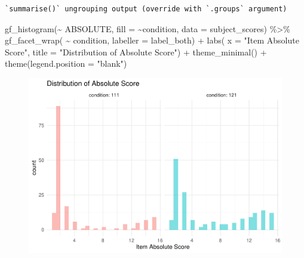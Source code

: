 \documentclass[
  letterpaper,
  DIV=11,
  numbers=noendperiod]{scrreprt}
\newenvironment{Shaded}{\begin{snugshade}}{\end{snugshade}}
\newcommand{\AttributeTok}[1]{\textcolor[rgb]{0.40,0.45,0.13}{#1}}
\newcommand{\FunctionTok}[1]{\textcolor[rgb]{0.28,0.35,0.67}{#1}}
\newcommand{\NormalTok}[1]{\textcolor[rgb]{0.00,0.23,0.31}{#1}}
\newcommand{\SpecialCharTok}[1]{\textcolor[rgb]{0.37,0.37,0.37}{#1}}
\newcommand{\StringTok}[1]{\textcolor[rgb]{0.13,0.47,0.30}{#1}}
\begin{document}
\begin{verbatim}
`summarise()` ungrouping output (override with `.groups` argument)
\end{verbatim}

\begin{Shaded}
\begin{Highlighting}[]
\FunctionTok{gf\_histogram}\NormalTok{(}\SpecialCharTok{\textasciitilde{}}\NormalTok{ ABSOLUTE, }\AttributeTok{fill =} \SpecialCharTok{\textasciitilde{}}\NormalTok{condition, }\AttributeTok{data =}\NormalTok{ subject\_scores) }\SpecialCharTok{\%\textgreater{}\%} 
  \FunctionTok{gf\_facet\_wrap}\NormalTok{( }\SpecialCharTok{\textasciitilde{}}\NormalTok{ condition, }\AttributeTok{labeller =}\NormalTok{ label\_both) }\SpecialCharTok{+} 
  \FunctionTok{labs}\NormalTok{( }\AttributeTok{x =} \StringTok{"Item Absolute Score"}\NormalTok{, }\AttributeTok{title =} \StringTok{"Distribution of Absolute Score"}\NormalTok{) }\SpecialCharTok{+} \FunctionTok{theme\_minimal}\NormalTok{() }\SpecialCharTok{+} \FunctionTok{theme}\NormalTok{(}\AttributeTok{legend.position =} \StringTok{"blank"}\NormalTok{)}
\end{Highlighting}
\end{Shaded}

\begin{figure}[H]

{\centering \includegraphics{analysis/SGC3A/2_sgc3A_scoring_files/figure-pdf/unnamed-chunk-89-1.pdf}

}

\end{figure}
\end{document}
